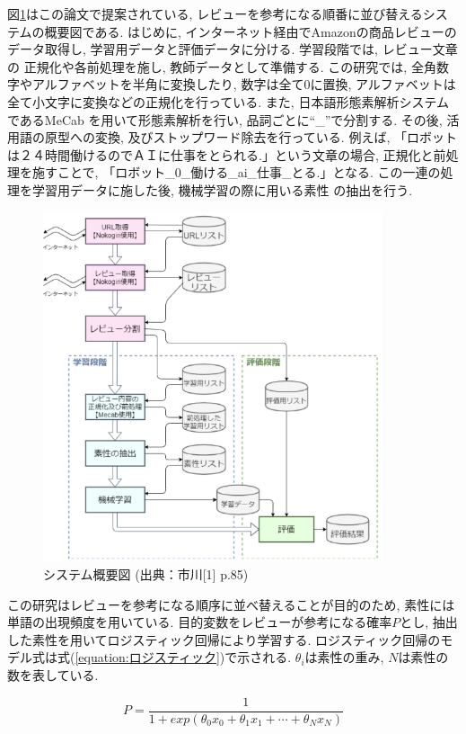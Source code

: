 \documentclass{ltjarticle}
\begin{document}
図\ref{fig:関連研究1システム概要図}はこの論文で提案されている, レビューを参考になる順番に並び替えるシステムの概要図である. はじめに, 
インターネット経由でAmazonの商品レビューのデータ取得し, 学習用データと評価データに分ける. 学習段階では, レビュー文章の
正規化や各前処理を施し, 教師データとして準備する. 
この研究では, 全角数字やアルファベットを半角に変換したり, 
数字は全て0に置換, アルファベットは全て小文字に変換などの正規化を行っている. また, 日本語形態素解析システムであるMeCab
を用いて形態素解析を行い, 品詞ごとに``\_''で分割する. その後, 活用語の原型への変換, 及びストップワード除去を行っている.
例えば, 「ロボットは２４時間働けるのでＡＩに仕事をとられる.」という文章の場合, 正規化と前処理を施すことで, 
「ロボット\_0\_働ける\_ai\_仕事\_とる.」となる. この一連の処理を学習用データに施した後, 機械学習の際に用いる素性
の抽出を行う. 
\begin{figure}[h]
    \centering
    \includegraphics[width=10cm]{images/system1.png}
    \caption{システム概要図 (出典：市川[1] p.85)}
    \label{fig:関連研究1システム概要図}
\end{figure}
この研究はレビューを参考になる順序に並べ替えることが目的のため, 素性には単語の出現頻度を用いている. 
目的変数をレビューが参考になる確率$P$とし, 抽出した素性を用いてロジスティック回帰により学習する. 
ロジスティック回帰のモデル式は式(\ref{equation:ロジスティック})で示される. $\theta_i$は素性の重み, $N$は素性の数を表している. 
\vspace{5truept}

\begin{equation}
    P=\dfrac{1}{1+exp(\theta_0x_0+\theta_1x_1+\cdots+\theta_Nx_N)}
    \label{equation:ロジスティック}
\end{equation}
\vspace{5truept}
\end{document}
